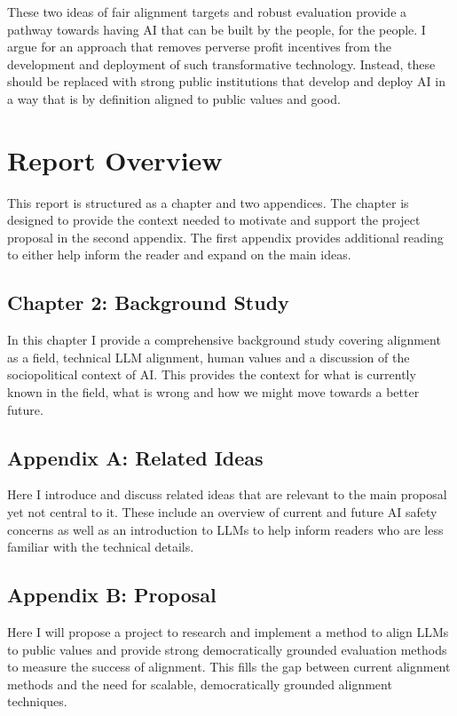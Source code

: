 These two ideas of fair alignment targets and robust evaluation provide a pathway towards having AI that can be built by the people, for the people. I argue for an approach that removes perverse profit incentives from the development and deployment of such transformative technology. Instead, these should be replaced with strong public institutions that develop and deploy AI in a way that is by definition aligned to public values and good.


\section{Report Overview}

This report is structured as a chapter and two appendices. The chapter is designed to provide the context needed to motivate and support the project proposal in the second appendix. The first appendix provides additional reading to either help inform the reader and expand on the main ideas.

\subsection*{Chapter 2: Background Study}

In this chapter I provide a comprehensive background study covering alignment as a field, technical LLM alignment, human values and a discussion of the sociopolitical context of AI. This provides the context for what is currently known in the field, what is wrong and how we might move towards a better future.

\subsection*{Appendix A: Related Ideas}

Here I introduce and discuss related ideas that are relevant to the main proposal yet not central to it. These include an overview of current and future AI safety concerns as well as an introduction to LLMs to help inform readers who are less familiar with the technical details.

\subsection*{Appendix B: Proposal}

Here I will propose a project to research and implement a method to align LLMs to public values and provide strong democratically grounded evaluation methods to measure the success of alignment. This fills the gap between current alignment methods and the need for scalable, democratically grounded alignment techniques.